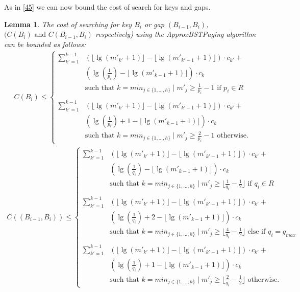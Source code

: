 \documentclass[letterpaper,12pt,titlepage,oneside,final]{book}
\theoremstyle{plain}
\newtheorem{lem}[thm]{Lemma}
\begin{document}
As in \ref{45} we can now bound the cost of search for keys and gaps.

\begin{lem} \label{ABSTExactLem}
The cost of searching for key $B_i$ or gap $(B_{i-1},B_i)$, $(C(B_i) \text{ and } C(B_{i-1},B_i)$ respectively) using the \textit{ApproxBSTPaging} algorithm can be bounded as follows: 
\begin{align*} 
C(B_i) \leq 
\begin{cases}
 \sum_{k'=1}^{k-1} &\left(\lfloor \lg(m'_{k'}+1) \rfloor - \lfloor \lg(m'_{k'-1}+1) \rfloor \right)\cdot c_{k'}+ \\
 &\left(\lg(\frac{1}{p_i}) - \lfloor \lg(m'_{k-1}+1) \rfloor \right)\cdot c_k\\
&\text{such that } k=min_{j \in \{1, ..., h\}} \mid m'_j \geq \frac{1}{p_i}-1 \text{ if } p_i \in R \\\\
 \sum_{k'=1}^{k-1} &\left(\lfloor \lg(m'_{k'}+1) \rfloor - \lfloor \lg(m'_{k'-1}+1) \rfloor \right)\cdot c_{k'}+ \\
 &\left(\lg(\frac{1}{p_i}) + 1 - \lfloor \lg(m'_{k-1}+1) \rfloor \right)\cdot c_k\\
&\text{such that } k=min_{j \in \{1, ..., h\}} \mid m'_j \geq \frac{2}{p_i}-1 \text{ otherwise.}  
\end{cases}
\end{align*}
\begin{align*}
C((B_{i-1},B_i)) \leq
\begin{cases}
 \sum_{k'=1}^{k-1} &\left(\lfloor \lg(m'_{k'}+1) \rfloor - \lfloor \lg(m'_{k'-1}+1) \rfloor \right)\cdot c_{k'}+ \\
 &\left(\lg(\frac{1}{q_i}) - \lfloor \lg(m'_{k-1}+1) \rfloor \right)\cdot c_k\\
&\text{such that } k=min_{j \in \{1, ..., h\}} \mid m'_j \geq \lfloor \frac{1}{q_i}-\frac{1}{2} \rfloor \text{ if } q_i \in R  \\\\
  \sum_{k'=1}^{k-1} &\left(\lfloor \lg(m'_{k'}+1) \rfloor - \lfloor \lg(m'_{k'-1}+1) \rfloor \right)\cdot c_{k'}+ \\
 &\left(\lg(\frac{1}{q_i}) + 2 - \lfloor \lg(m'_{k-1}+1) \rfloor \right)\cdot c_k\\
&\text{such that } k=min_{j \in \{1, ..., h\}} \mid m'_j \geq \lfloor \frac{4}{q_i}-\frac{1}{2} \rfloor \text{ else if } q_i = q_{max}  \\\\
 \sum_{k'=1}^{k-1} &\left(\lfloor \lg(m'_{k'}+1) \rfloor - \lfloor \lg(m'_{k'-1}+1) \rfloor \right)\cdot c_{k'}+ \\
 &\left(\lg(\frac{1}{q_i})+1 - \lfloor \lg(m'_{k-1}+1) \rfloor \right)\cdot c_k\\
&\text{such that } k=min_{j \in \{1, ..., h\}} \mid m'_j \geq \lfloor \frac{2}{q_i}-\frac{1}{2} \rfloor \text{ otherwise.}
\end{cases}
\end{align*}
\end{lem}
\end{document}
